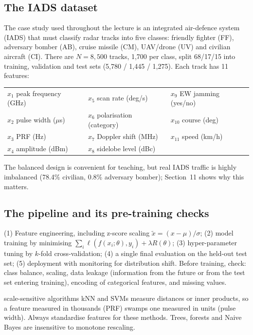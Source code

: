 \documentclass[11pt]{article}
\begin{document}
\subsection{The IADS dataset}
The case study used throughout the lecture is an integrated air-defence system (IADS) that must classify radar tracks into five classes: friendly fighter (FF), adversary bomber (AB), cruise missile (CM), UAV/drone (UV) and civilian aircraft (CI). There are $N=8{,}500$ tracks, 1,700 per class, split 68/17/15 into training, validation and test sets (5,780 / 1,445 / 1,275). Each track has 11 features:
\begin{center}\small\renewcommand{\arraystretch}{1.2}
\begin{tabular}{lll}\toprule $x_1$ peak frequency (GHz) & $x_5$ scan rate (deg/s) & $x_9$ EW jamming (yes/no)\\ $x_2$ pulse width ($\mu$s) & $x_6$ polarisation (category) & $x_{10}$ course (deg)\\ $x_3$ PRF (Hz) & $x_7$ Doppler shift (MHz) & $x_{11}$ speed (km/h)\\ $x_4$ amplitude (dBm) & $x_8$ sidelobe level (dBc) & \\\bottomrule\end{tabular}\end{center}
The balanced design is convenient for teaching, but real IADS traffic is highly imbalanced (78.4\% civilian, 0.8\% adversary bomber); Section~11 shows why this matters.

\subsection{The pipeline and its pre-training checks}
(1) Feature engineering, including z-score scaling $\tilde x=(x-\mu)/\sigma$; (2) model training by minimising $\sum_i\ell(f(x_i;\theta),y_i)+\lambda R(\theta)$; (3) hyper-parameter tuning by $k$-fold cross-validation; (4) a single final evaluation on the held-out test set; (5) deployment with monitoring for distribution shift. Before training, check: class balance, scaling, data leakage (information from the future or from the test set entering training), encoding of categorical features, and missing values.

\begin{pitfall}{scale-sensitive algorithms}
kNN and SVMs measure distances or inner products, so a feature measured in thousands (PRF) swamps one measured in units (pulse width). Always standardise features for these methods. Trees, forests and Naive Bayes are insensitive to monotone rescaling.
\end{pitfall}
\end{document}
